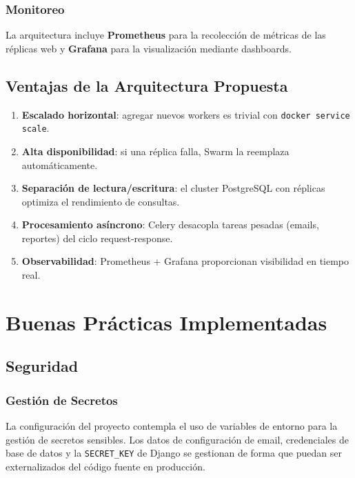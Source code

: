 \documentclass[12pt, a4paper]{article}
\begin{document}
\subsubsection{Monitoreo}

La arquitectura incluye \textbf{Prometheus} para la recolección de métricas de las réplicas web y \textbf{Grafana} para la visualización mediante dashboards.

\subsection{Ventajas de la Arquitectura Propuesta}

\begin{enumerate}
    \item \textbf{Escalado horizontal}: agregar nuevos workers es trivial con \texttt{docker service scale}.
    \item \textbf{Alta disponibilidad}: si una réplica falla, Swarm la reemplaza automáticamente.
    \item \textbf{Separación de lectura/escritura}: el cluster PostgreSQL con réplicas optimiza el rendimiento de consultas.
    \item \textbf{Procesamiento asíncrono}: Celery desacopla tareas pesadas (emails, reportes) del ciclo request-response.
    \item \textbf{Observabilidad}: Prometheus + Grafana proporcionan visibilidad en tiempo real.
\end{enumerate}

\section{Buenas Prácticas Implementadas}
\label{sec:buenas-practicas}

\subsection{Seguridad}

\subsubsection{Gestión de Secretos}

La configuración del proyecto contempla el uso de variables de entorno para la gestión de secretos sensibles. Los datos de configuración de email, credenciales de base de datos y la \texttt{SECRET\_KEY} de Django se gestionan de forma que puedan ser externalizados del código fuente en producción.
\end{document}
